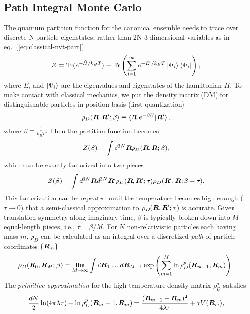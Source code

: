 \subsection{Path Integral Monte Carlo} \label{sec:method-pimc}
The quantum partition function for the canonical ensemble needs to trace over discrete N-particle eigenstates, rather than 2N 3-dimensional variables as in eq.~(\ref{eq:classical-nvt-part})
\begin{align}
Z\equiv \text{Tr}(e^{-\hat{H}/k_BT})=\text{Tr}\left(
\sum\limits_{i=1}^{\infty} e^{-E_i/k_BT}\ket{\Psi_i}\bra{\Psi_i}
\right),
\end{align}
where $E_i$ and $\ket{\Psi_i}$ are the eigenvalues and eigenstates of the hamiltonian $H$. To make contact with classical mechanics, we put the density matrix (DM) for distinguishable particles in position basis (first quantization)
\begin{align}
\rho_D(\boldsymbol{R}, \boldsymbol{R}'; \beta) \equiv \braket{\boldsymbol{R}|e^{-\beta H}|\boldsymbol{R}'},
\end{align}
where $\beta\equiv \frac{1}{k_B T}$. 
Then the partition function becomes
\begin{align} \label{eq:quantum-nvt-zd}
Z(\beta) = \int d^{3N}\boldsymbol{R} \rho_D(\boldsymbol{R},\boldsymbol{R};\beta),
\end{align}
which can be exactly factorized into two pieces
\begin{align}
Z(\beta) = \int d^{3N}\boldsymbol{R}d^{3N}\boldsymbol{R}' \rho_D(\boldsymbol{R},\boldsymbol{R}';\tau)\rho_D(\boldsymbol{R}',\boldsymbol{R};\beta-\tau).
\end{align}
This factorization can be repeated until the temperature becomes high enough ($\tau\rightarrow0$) that a semi-classical approximation to $\rho_D(\boldsymbol{R},\boldsymbol{R}';\tau)$ is accurate. Given translation symmetry along imaginary time, $\beta$ is typically broken down into $M$ equal-length pieces, i.e., $\tau=\beta/M$.
For $N$ non-relativistic particles each having mass $m$, $\rho_D$ can be calculated as an integral over a discretized \textit{path} of particle coordinates $\{\boldsymbol{R}_m\}$
\begin{align} \label{eq:pimc-rhod}
\rho_D(\boldsymbol{R}_0,\boldsymbol{R}_M;\beta) = \lim\limits_{M\rightarrow\infty} \int d\boldsymbol{R}_1\dots d\boldsymbol{R}_{M-1}\exp\left(\sum\limits_{m=1}^M \ln \rho_D^p(\boldsymbol{R}_{m-1},\boldsymbol{R}_m) \right).
\end{align}
The \emph{primitive approximation} for the high-temperature density matrix $\rho_D^p$ satisfies
\begin{align} \label{eq:pimc-rho-prim}
\dfrac{dN}{2}\ln(4\pi\lambda\tau)-\ln \rho_D^p(\boldsymbol{R}_m-1, \boldsymbol{R}_m) = \dfrac{(\boldsymbol{R}_{m-1}-\boldsymbol{R}_m)^2}{4\lambda\tau} + \tau V(\boldsymbol{R}_m),
\end{align}
